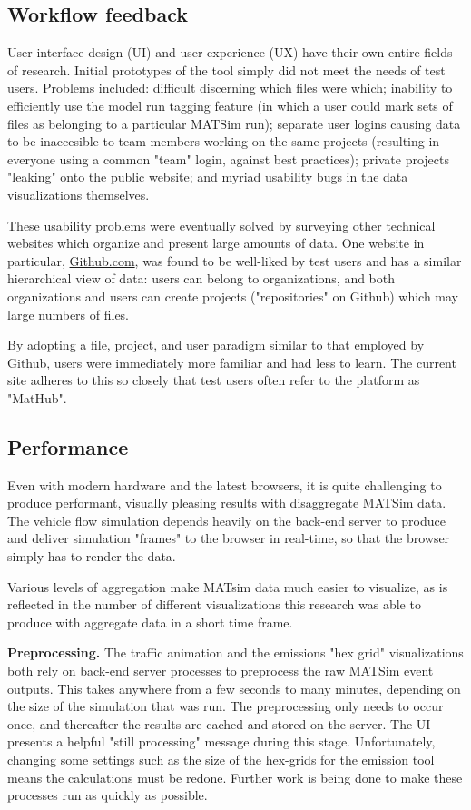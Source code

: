 \documentclass[Afour,sagev,times]{sagej}
\begin{document}
\subsection{Workflow feedback}

User interface design (UI) and user experience (UX) have their own entire fields of research. Initial prototypes of the tool simply did not meet the needs of test users. Problems included: difficult discerning which files were which; inability to efficiently use the model run tagging feature (in which a user could mark sets of files as belonging to a particular MATSim run); separate user logins causing data to be inaccesible to team members working on the same projects (resulting in everyone using a common "team" login, against best practices); private projects "leaking" onto the public website; and myriad usability bugs in the data visualizations themselves.

These usability problems were eventually solved by surveying other technical websites which organize and present large amounts of data. One website in particular, \url{Github.com}, was found to be well-liked by test users and has a similar hierarchical view of data: users can belong to organizations, and both organizations and users can create projects ("repositories" on Github) which may large numbers of files.

By adopting a file, project, and user paradigm similar to that employed by Github, users were immediately more familiar and had less to learn. The current site adheres to this so closely that test users often refer to the platform as "MatHub".

\subsection{Performance}

Even with modern hardware and the latest browsers, it is quite challenging to produce performant, visually pleasing results with disaggregate MATSim data. The vehicle flow simulation depends heavily on the back-end server to produce and deliver simulation "frames" to the browser in real-time, so that the browser simply has to render the data.

Various levels of aggregation make MATsim data much easier to visualize, as is reflected in the number of different visualizations this research was able to produce with aggregate data in a short time frame.

\textbf{Preprocessing.} The traffic animation and the emissions "hex grid" visualizations both rely on back-end server processes to preprocess the raw MATSim event outputs. This takes anywhere from a few seconds to many minutes, depending on the size of the simulation that was run. The preprocessing only needs to occur once, and thereafter the results are cached and stored on the server. The UI presents a helpful "still processing" message during this stage. Unfortunately, changing some settings such as the size of the hex-grids for the emission tool means the calculations must be redone. Further work is being done to make these processes run as quickly as possible.
\end{document}
